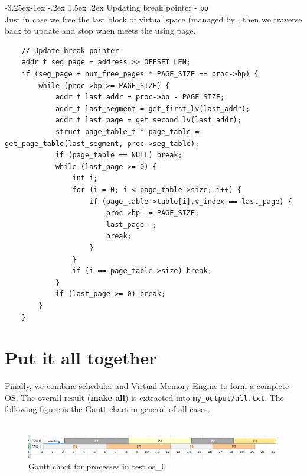 \documentclass[a4paper]{article}
\makeatletter
\newcounter {subsubsubsection}[subsubsection]
\newcommand\subsubsubsection{\@startsection{subsubsubsection}{4}{\z@}%
                                     {-3.25ex\@plus -1ex \@minus -.2ex}%
                                     {1.5ex \@plus .2ex}%
                                     {\normalfont\normalsize\bfseries}}
\makeatother
\begin{document}
	\subsubsubsection{Updating break pointer - \texttt{bp}}
	\hfill\\
	Just in case we free the last block of virtual space (managed by , then we traverse back to update and stop when meets the using page.
	\begin{lstlisting}
	// Update break pointer
	addr_t seg_page = address >> OFFSET_LEN;
	if (seg_page + num_free_pages * PAGE_SIZE == proc->bp) {
		while (proc->bp >= PAGE_SIZE) {
		    addr_t last_addr = proc->bp - PAGE_SIZE;
		    addr_t last_segment = get_first_lv(last_addr);
		    addr_t last_page = get_second_lv(last_addr);
		    struct page_table_t * page_table = get_page_table(last_segment, proc->seg_table);
		    if (page_table == NULL) break;
		    while (last_page >= 0) {
			    int i;
			    for (i = 0; i < page_table->size; i++) {
				    if (page_table->table[i].v_index == last_page) {
					    proc->bp -= PAGE_SIZE;
					    last_page--;
					    break;
				    }
			    }
			    if (i == page_table->size) break;
		    }
		    if (last_page >= 0) break;
	    }
	}
	\end{lstlisting}


\section{Put it all together}
Finally, we combine scheduler and Virtual Memory Engine to form a complete OS. The overall result (\textbf{make all}) is extracted into \texttt{my\_output/all.txt}. The following figure is the Gantt chart in general of all cases. \\
\\
    \begin{figure}[h]
	    \centering
	    \includegraphics[width=\textwidth]{TEST2.PNG}
	    \caption{Gantt chart for processes in test os\_0}
	    \label{fig:my_label}
	\end{figure}
\end{document}
